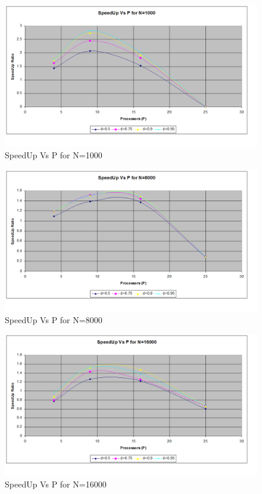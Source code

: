 \documentclass[twoside,11pt]{article}\usepackage{amsmath,amsfonts,amsthm,fullpage}
\begin{document}
\begin{figure}[!htbp]
\centering
\includegraphics[scale=.46]{charts/speedup_p_d_n_1000} 
\caption{SpeedUp Vs P for N=1000}
\label{SpeedUp Vs P for N=1000}
\end{figure}

\begin{figure}[!htbp]
\centering
\includegraphics[scale=.46]{charts/speedup_p_d_n_8000} 
\caption{SpeedUp Vs P for N=8000}
\label{SpeedUp Vs P for N=8000}
\end{figure}

\begin{figure}[!htbp]
\centering
\includegraphics[scale=.46]{charts/speedup_p_d_n_16000} 
\caption{SpeedUp Vs P for N=16000}
\label{SpeedUp Vs P for N=16000}
\end{figure}
\end{document}
